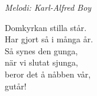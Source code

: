 {\footnotesize\textit{Melodi: Karl-Alfred Boy}}\par
\vspace{10pt}
Domkyrkan stilla står.\\
Har gjort så i många år.\\
Så synes den gunga,\\
när vi slutat sjunga,\\
beror det å nåbben vår,\\
gutår!
